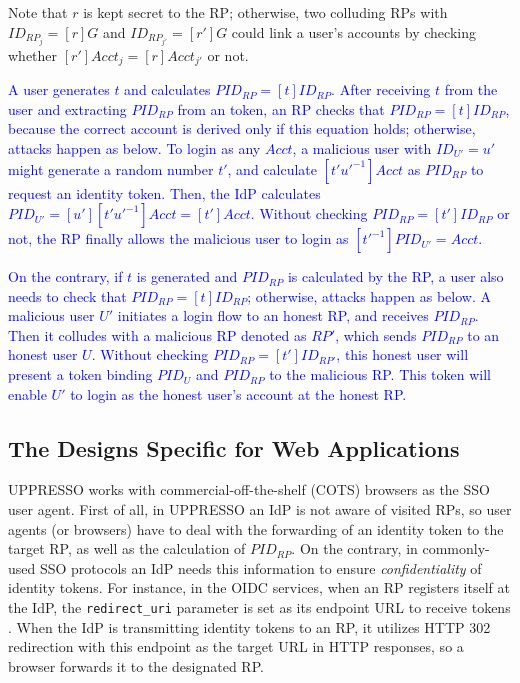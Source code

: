 Note that $r$ is kept secret to the RP; otherwise, two colluding RPs with $ID_{RP_j} = [r]G$ and $ID_{RP_{j'}} = [r']G$ could link a user's accounts by checking whether $[r']Acct_j = [r]Acct_{j'}$ or not.

\textcolor{blue}{A user generates $t$ and calculates $PID_{RP} = [t]ID_{RP}$.
After receiving $t$ from the user and extracting $PID_{RP}$ from an token,
    an RP checks that $PID_{RP} = [t]ID_{RP}$,
        because the correct account is derived only if this equation holds;
        otherwise, attacks happen as below.
To login as any $Acct$,
        a malicious user with $ID_{U'} = u'$ might generate a random number $t'$,
            and calculate $[t'u'^{-1}]Acct$ as $PID_{RP}$ to request an identity token.
Then, the IdP calculates $PID_{U'} = [u'][t'u'^{-1}]Acct = [t']Acct$.
Without checking $PID_{RP} = [t']ID_{RP}$ or not,
        the RP finally allows the malicious user to login as $[t'^{-1}]PID_{U'} = Acct$.}


\textcolor{blue}{On the contrary,
    if $t$ is generated and $PID_{RP}$ is calculated by the RP,
a user also needs to check that $PID_{RP} = [t]ID_{RP}$;
    otherwise, attacks happen as below.
A malicious user $U'$ initiates a login flow to an honest RP,
    and receives $PID_{RP}$.
Then it colludes with a malicious RP denoted as $RP'$,
    which sends $PID_{RP}$ to an honest user $U$.
Without checking $PID_{RP} = [t']ID_{RP'}$,
    this honest user will present a token binding $PID_U$ and $PID_{RP}$ to the malicious RP.
This token will enable $U'$ to login as the honest user's account at the honest RP.}



\subsection{The Designs Specific for Web Applications}
\label{sec:web-design}
UPPRESSO works with commercial-off-the-shelf (COTS) browsers as the SSO user agent.
First of all, in UPPRESSO an IdP is not aware of visited RPs,
 so user agents (or browsers) have to deal with the forwarding of an identity token
    to the target RP, as well as the calculation of $PID_{RP}$.
On the contrary,
    in commonly-used SSO protocols \cite{OpenIDConnect,rfc6749,SAML,SAMLIdentifier} an IdP needs this information to ensure \emph{confidentiality} of identity tokens.
For instance, in the OIDC services, when an RP registers itself at the IdP, the \verb+redirect_uri+ parameter
    is set as its endpoint URL to receive tokens  \cite{OpenIDConnect}.
When the IdP is transmitting identity tokens to an RP,
    it utilizes HTTP 302 redirection with this endpoint as the target URL in HTTP responses,
     so a browser forwards it to the designated RP.

